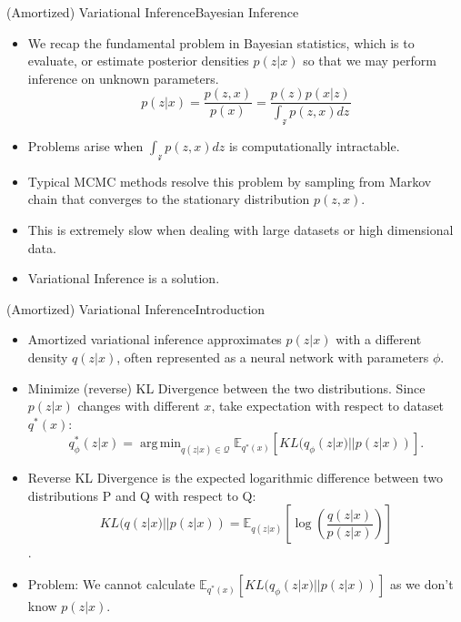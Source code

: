 \documentclass{beamer}
\newcommand{\E}{\mathbb{E}}
\DeclareMathOperator*{\argmin}{arg\,min}
\begin{document}
\begin{frame}{(Amortized) Variational Inference}{Bayesian Inference}
  \begin{itemize}
  \item {
    We recap the fundamental problem in Bayesian statistics, which is to evaluate, or estimate posterior densities $p(z|x)$ so that we may perform inference on unknown parameters.
  }
  \begin{equation*}
p(z|x)=\frac{p(z,x)}{p(x)}= \frac{p(z)p(x|z)}{\int_\mathcal{z}p(z,x)dz}
\end{equation*}
  \item {   
    Problems arise when $\int_\mathcal{z}p(z,x)dz$ is computationally intractable.
  }
  \item {
    Typical MCMC methods resolve this problem by sampling from Markov chain that converges to the stationary distribution $p(z,x)$.
  }
  \item {
    This is extremely slow when dealing with large datasets or high dimensional data.
  }
  \item {
    Variational Inference is a solution.
  }
  \end{itemize}
\end{frame}
\begin{frame}{(Amortized) Variational Inference}{Introduction}
\begin{itemize}
\item Amortized variational inference approximates $p(z|x)$ with a different density $q(z|x)$, often represented as a neural network with parameters $\phi$.
\item Minimize (reverse) KL Divergence between the two distributions. Since $p(z|x)$ changes with different $x$, take expectation with respect to dataset $q^*(x)$:
\begin{equation*}
q^*_\phi(z|x)=\argmin_{q(z|x)\in \mathcal{Q}}\E_{q^*(x)}[KL(q_\phi(z|x)||p(z|x))].
\end{equation*}
\item Reverse KL Divergence is the expected logarithmic difference between two distributions P and Q with respect to Q:
\[KL(q(z|x)||p(z|x))=\mathbb{E}_{q(z|x)}\left[\log \left(\frac{q(z|x)}{p(z|x)}\right)\right]\].
\item Problem: We cannot calculate $\E_{q^*(x)}[KL(q_\phi(z|x)||p(z|x))]$ as we don't know $p(z|x)$.
\end{itemize}
\end{frame}
\end{document}
